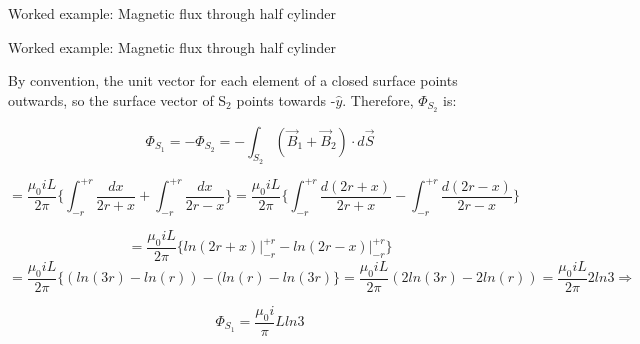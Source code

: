 {\begin{frame}{Worked example: Magnetic flux through half cylinder}
\end{frame}

%
%
%

\begin{frame}{Worked example: Magnetic flux through half cylinder}

  By convention, the unit vector for each element of a closed surface points outwards,
  so the surface vector of S$_2$ points towards -$\hat{y}$.
  Therefore, $\Phi_{S_2}$ is:

  \begin{equation*}
  	\Phi_{S_1} =
  	- \Phi_{S_2} =
  	- \int_{S_2} (\vec{B}_1 + \vec{B}_2) \cdot d\vec{S}
  \end{equation*}

  \begin{equation*}
  	= \frac{\mu_0 i L}{2\pi}
  	   \big\{
  		   \int_{-r}^{+r} \frac{dx}{2r+x} +
  			 \int_{-r}^{+r} \frac{dx}{2r-x}
  	   \big\}
    = \frac{\mu_0 i L}{2\pi}
  	   \big\{
  		   \int_{-r}^{+r} \frac{d(2r+x)}{2r+x} -
  			 \int_{-r}^{+r} \frac{d(2r-x)}{2r-x}
  	   \big\}
  \end{equation*}

  \begin{equation*}
  	=
  	   \frac{\mu_0 i L}{2\pi}
  	   \big\{
  		   ln(2r+x) \rvert_{-r}^{+r} -
  			 ln(2r-x) \rvert_{-r}^{+r}
  	   \big\}
  \end{equation*}
  \begin{equation*}
  	=
  		 \frac{\mu_0 i L}{2\pi}
  		 \big\{
  		   (ln(3r) - ln(r)) -
  			 (ln(r) - ln(3r)
  	   \big\}
  	= \frac{\mu_0 i L}{2\pi}
  		  (2ln(3r) - 2ln(r))
    = \frac{\mu_0 i L}{2\pi} 2 ln3 \Rightarrow
  \end{equation*}

  \begin{equation*}
  	\Phi_{S_1} =
  	    \frac{\mu_0 i}{\pi} L ln3
  \end{equation*}


\end{frame}

} %



%
%

